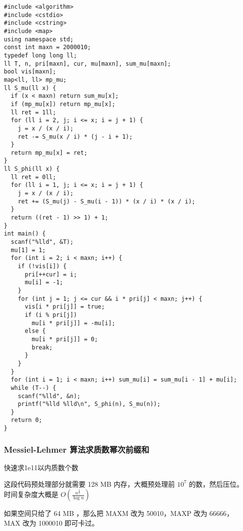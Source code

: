 \documentclass[UTF8]{ctexart}
\begin{document}
\begin{framed}
\begin{lstlisting}
#include <algorithm>
#include <cstdio>
#include <cstring>
#include <map>
using namespace std;
const int maxn = 2000010;
typedef long long ll;
ll T, n, pri[maxn], cur, mu[maxn], sum_mu[maxn];
bool vis[maxn];
map<ll, ll> mp_mu;
ll S_mu(ll x) {
  if (x < maxn) return sum_mu[x];
  if (mp_mu[x]) return mp_mu[x];
  ll ret = 1ll;
  for (ll i = 2, j; i <= x; i = j + 1) {
    j = x / (x / i);
    ret -= S_mu(x / i) * (j - i + 1);
  }
  return mp_mu[x] = ret;
}
ll S_phi(ll x) {
  ll ret = 0ll;
  for (ll i = 1, j; i <= x; i = j + 1) {
    j = x / (x / i);
    ret += (S_mu(j) - S_mu(i - 1)) * (x / i) * (x / i);
  }
  return ((ret - 1) >> 1) + 1;
}
int main() {
  scanf("%lld", &T);
  mu[1] = 1;
  for (int i = 2; i < maxn; i++) {
    if (!vis[i]) {
      pri[++cur] = i;
      mu[i] = -1;
    }
    for (int j = 1; j <= cur && i * pri[j] < maxn; j++) {
      vis[i * pri[j]] = true;
      if (i % pri[j])
        mu[i * pri[j]] = -mu[i];
      else {
        mu[i * pri[j]] = 0;
        break;
      }
    }
  }
  for (int i = 1; i < maxn; i++) sum_mu[i] = sum_mu[i - 1] + mu[i];
  while (T--) {
    scanf("%lld", &n);
    printf("%lld %lld\n", S_phi(n), S_mu(n));
  }
  return 0;
}
\end{lstlisting}
\end{framed}

\subsubsection{Messiel-Lehmer 算法求质数幂次前缀和}
快速求1e11以内质数个数

这段代码预处理部分就需要 128 MB 内存，大概预处理前 $10^7$ 的数，然后压位。时间复杂度大概是 $O(\frac{n^{\frac{2}{3}}}{\log n})$

如果空间只给了 64 MB ，那么把 MAXM 改为 50010，MAXP 改为 66666，MAX 改为 1000010 即可卡过。
\end{document}

